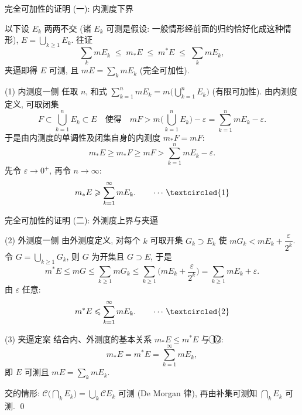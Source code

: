 
\begin{frame}{完全可加性的证明 (一): 内测度下界}

以下设 $E_k$ \alert{两两不交} (诸 $E_k$ 可测是假设: 一般情形经前面的归约恰好化成这种情形), $E = \bigcup_{k \geqslant 1} E_k$. 往证
\[
\sum_k m E_k \;\leqslant\; m_* E \;\leqslant\; m^* E \;\leqslant\; \sum_k m E_k,
\]
夹逼即得 $E$ 可测, 且 $mE = \sum_k m E_k$ (完全可加性).

\pause

\startproof[bg=yellow, fg=red](1) 内测度一侧
任取 $n$, 和式 $\sum_{k=1}^n m E_k = m\big(\bigcup_{k=1}^n E_k\big)$ (有限可加性). 由内测度定义, 可取闭集
\[
F \subset \bigcup_{k=1}^n E_k \subset E
\quad \text{使得} \quad
mF > m\Big(\bigcup_{k=1}^n E_k\Big) - \varepsilon = \sum_{k=1}^n m E_k - \varepsilon .
\]
于是由内测度的单调性及闭集自身的内测度 $m_* F = mF$:
\[
m_* E \geqslant m_* F \geqslant mF > \sum_{k=1}^n m E_k - \varepsilon .
\]
先令 $\varepsilon \to 0^+$, 再令 $n \to \infty$:
\[
m_* E \geqslant \sum_{k=1}^\infty m E_k .
\qquad \cdots\, \textcircled{1}
\]

\end{frame}


\begin{frame}{完全可加性的证明 (二): 外测度上界与夹逼}

\startproof[bg=yellow, fg=red](2) 外测度一侧
由外测度定义, 对每个 $k$ 可取开集 $G_k \supset E_k$ 使 $m G_k < m E_k + \dfrac{\varepsilon}{2^k}$.
令 $G = \bigcup_{k \geqslant 1} G_k$, 则 $G$ 为开集且 $G \supset E$, 于是
\[
m^* E \leqslant m G \leqslant \sum_{k \geqslant 1} m G_k
\leqslant \sum_{k \geqslant 1} \Big(m E_k + \frac{\varepsilon}{2^k}\Big)
= \sum_{k \geqslant 1} m E_k + \varepsilon .
\]
由 $\varepsilon$ 任意:
\[
m^* E \leqslant \sum_{k=1}^\infty m E_k .
\qquad \cdots\, \textcircled{2}
\]

\pause

\startproof[bg=yellow, fg=red](3) 夹逼定案
结合内、外测度的基本关系 $m_* E \leqslant m^* E$ 与 \textcircled{1}\textcircled{2}:
\[
m_* E = m^* E = \sum_{k=1}^\infty m E_k ,
\]
即 $E$ 可测且 $mE = \sum_k mE_k$.

\pause

交的情形: $\mathscr{C}\big(\bigcap_k E_k\big) = \bigcup_k \mathscr{C}E_k$ 可测 (De Morgan 律), 再由补集可测知 $\bigcap_k E_k$ 可测.
\qed

\end{frame}

